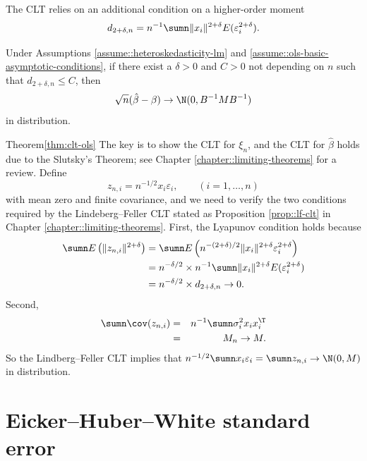 The CLT
relies on an additional condition on a higher-order moment 
\[
d_{2+\delta,n}=n^{-1}\sumn\|x_{i}\|^{2+\delta}E(\varepsilon_{i}^{2+\delta}).
\]

\begin{theorem}
\label{thm:clt-ols} Under Assumptions \ref{assume::heteroskedasticity-lm} and \ref{assume::ols-basic-asymptotic-conditions}, if there exist
a $\delta>0$ and $C>0$ not depending on $n$ such that $d_{2+\delta,n} \leq C$,
then 
$$
\sqrt{n}(\hat{\beta}-\beta)\rightarrow\N(0,B^{-1}MB^{-1})
$$
in distribution. 
\end{theorem}


\begin{myproof}{Theorem}{\ref{thm:clt-ols}}
The key is to show the CLT for $ \xi_n$, and the CLT for $\hat{\beta}$ holds due to the Slutsky's Theorem; see Chapter \ref{chapter::limiting-theorems} for a review. Define 
\[
z_{n,i}=n^{-1/2}x_{i}\varepsilon_{i},\qquad(i=1,\ldots,n)
\]
with mean zero and finite covariance, and we need to verify the two conditions required by the Lindeberg--Feller CLT stated as Proposition \ref{prop::lf-clt} in Chapter \ref{chapter::limiting-theorems}. First, the Lyapunov condition holds because
\begin{align*}
\sumn E\left(  \|z_{n,i}\|^{2+\delta} \right) 
& =\sumn E\left(  n^{-(2+\delta)/2}\|x_{i}\|^{2+\delta}\varepsilon_{i}^{2+\delta}  \right)\\
 & =n^{-\delta/2} \times n^{-1}\sumn\|x_{i}\|^{2+\delta}E(\varepsilon_{i}^{2+\delta}) \\
 & =n^{-\delta/2} \times  d_{2+\delta,n} \rightarrow0.
\end{align*}
Second, 
\begin{eqnarray*}
\sumn\cov(z_{n,i})  &=&  n^{-1}\sumn\sigma_{i}^{2}x_{i}x_{i}^{\T} \\
&=& M_{n}\rightarrow M.
\end{eqnarray*}
So the Lindberg--Feller CLT implies that $n^{-1/2}\sumn x_{i}\varepsilon_{i}=\sumn z_{n,i}\rightarrow\N(0,M)$
in distribution. 
\end{myproof}







\section{Eicker--Huber--White standard error}


